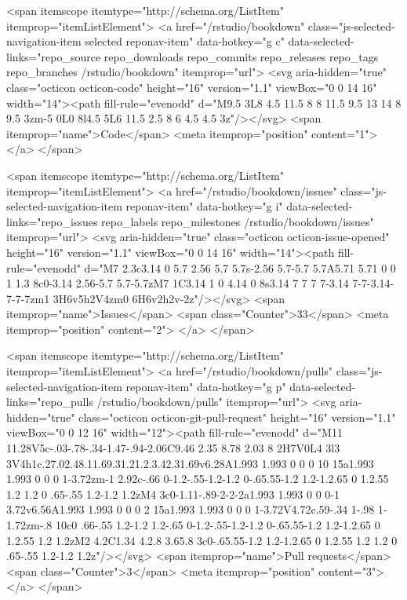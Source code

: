   <span itemscope itemtype="http://schema.org/ListItem" itemprop="itemListElement">
    <a href="/rstudio/bookdown" class="js-selected-navigation-item selected reponav-item" data-hotkey="g c" data-selected-links="repo_source repo_downloads repo_commits repo_releases repo_tags repo_branches /rstudio/bookdown" itemprop="url">
      <svg aria-hidden="true" class="octicon octicon-code" height="16" version="1.1" viewBox="0 0 14 16" width="14"><path fill-rule="evenodd" d="M9.5 3L8 4.5 11.5 8 8 11.5 9.5 13 14 8 9.5 3zm-5 0L0 8l4.5 5L6 11.5 2.5 8 6 4.5 4.5 3z"/></svg>
      <span itemprop="name">Code</span>
      <meta itemprop="position" content="1">
</a>  </span>

    <span itemscope itemtype="http://schema.org/ListItem" itemprop="itemListElement">
      <a href="/rstudio/bookdown/issues" class="js-selected-navigation-item reponav-item" data-hotkey="g i" data-selected-links="repo_issues repo_labels repo_milestones /rstudio/bookdown/issues" itemprop="url">
        <svg aria-hidden="true" class="octicon octicon-issue-opened" height="16" version="1.1" viewBox="0 0 14 16" width="14"><path fill-rule="evenodd" d="M7 2.3c3.14 0 5.7 2.56 5.7 5.7s-2.56 5.7-5.7 5.7A5.71 5.71 0 0 1 1.3 8c0-3.14 2.56-5.7 5.7-5.7zM7 1C3.14 1 0 4.14 0 8s3.14 7 7 7 7-3.14 7-7-3.14-7-7-7zm1 3H6v5h2V4zm0 6H6v2h2v-2z"/></svg>
        <span itemprop="name">Issues</span>
        <span class="Counter">33</span>
        <meta itemprop="position" content="2">
</a>    </span>

  <span itemscope itemtype="http://schema.org/ListItem" itemprop="itemListElement">
    <a href="/rstudio/bookdown/pulls" class="js-selected-navigation-item reponav-item" data-hotkey="g p" data-selected-links="repo_pulls /rstudio/bookdown/pulls" itemprop="url">
      <svg aria-hidden="true" class="octicon octicon-git-pull-request" height="16" version="1.1" viewBox="0 0 12 16" width="12"><path fill-rule="evenodd" d="M11 11.28V5c-.03-.78-.34-1.47-.94-2.06C9.46 2.35 8.78 2.03 8 2H7V0L4 3l3 3V4h1c.27.02.48.11.69.31.21.2.3.42.31.69v6.28A1.993 1.993 0 0 0 10 15a1.993 1.993 0 0 0 1-3.72zm-1 2.92c-.66 0-1.2-.55-1.2-1.2 0-.65.55-1.2 1.2-1.2.65 0 1.2.55 1.2 1.2 0 .65-.55 1.2-1.2 1.2zM4 3c0-1.11-.89-2-2-2a1.993 1.993 0 0 0-1 3.72v6.56A1.993 1.993 0 0 0 2 15a1.993 1.993 0 0 0 1-3.72V4.72c.59-.34 1-.98 1-1.72zm-.8 10c0 .66-.55 1.2-1.2 1.2-.65 0-1.2-.55-1.2-1.2 0-.65.55-1.2 1.2-1.2.65 0 1.2.55 1.2 1.2zM2 4.2C1.34 4.2.8 3.65.8 3c0-.65.55-1.2 1.2-1.2.65 0 1.2.55 1.2 1.2 0 .65-.55 1.2-1.2 1.2z"/></svg>
      <span itemprop="name">Pull requests</span>
      <span class="Counter">3</span>
      <meta itemprop="position" content="3">
</a>  </span>

